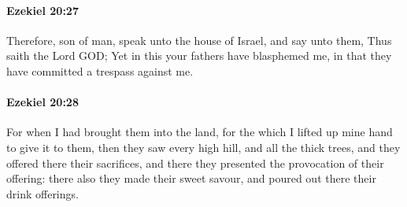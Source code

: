 		\paragraph{Ezekiel 20:27} %
			\label{EZEKIEL-20-27}

			Therefore, son of man, speak unto the house of Israel, and say unto them, Thus saith the Lord GOD; Yet in this your fathers have blasphemed me, in that they have committed a trespass against me.


		\paragraph{Ezekiel 20:28} %
			\label{EZEKIEL-20-28}

			For when I had brought them into the land, for the which I lifted up mine hand to give it to them, then they saw every high hill, and all the thick trees, and they offered there their sacrifices, and there they presented the provocation of their offering: there also they made their sweet savour, and poured out there their drink offerings.


